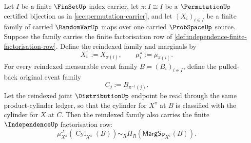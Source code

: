 \begin{theorem}
\label{thm:independence-finite-reindexing-invariance}
Let $I$ be a finite $\FinSetUp$ index carrier, let $\pi:I\cong I$ be a $\PermutationUp$ certified bijection as in \autoref{sec:permutation-carrier}, and let $(X_i)_{i\in I}$ be a finite family of carried $\RandomVarUp$ maps over one carried $\ProbSpaceUp$ source. Suppose the family carries the finite factorisation row of \autoref{def:independence-finite-factorisation-row}. Define the reindexed family and marginals by
$$
X_i^{\pi}:=X_{\pi(i)},\qquad \mu_i^{\pi}:=\mu_{\pi(i)}.
$$
For every reindexed measurable event family $B=(B_i)_{i\in I}$, define the pulled-back original event family
$$
C_j:=B_{\pi^{-1}(j)}.
$$
Let the reindexed joint $\DistributionUp$ endpoint be read through the same product-cylinder ledger, so that the cylinder for $X^{\pi}$ at $B$ is classified with the cylinder for $X$ at $C$. Then the reindexed family also carries the finite $\IndependenceUp$ factorisation row:
$$
\mu_{X^{\pi}}^J(\operatorname{Cyl}_{X^{\pi}}(B))
\sim_R
\Pi_R(\mathsf{MargSp}_{X^{\pi}}(B)).
$$
\end{theorem}
